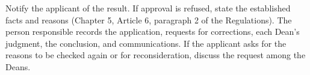 Notify the applicant of the result. If approval is refused, state the established facts and reasons (Chapter 5, Article 6, paragraph 2 of the Regulations).
The person responsible records the application, requests for corrections, each Dean's judgment, the conclusion, and communications.
If the applicant asks for the reasons to be checked again or for reconsideration, discuss the request among the Deans.
